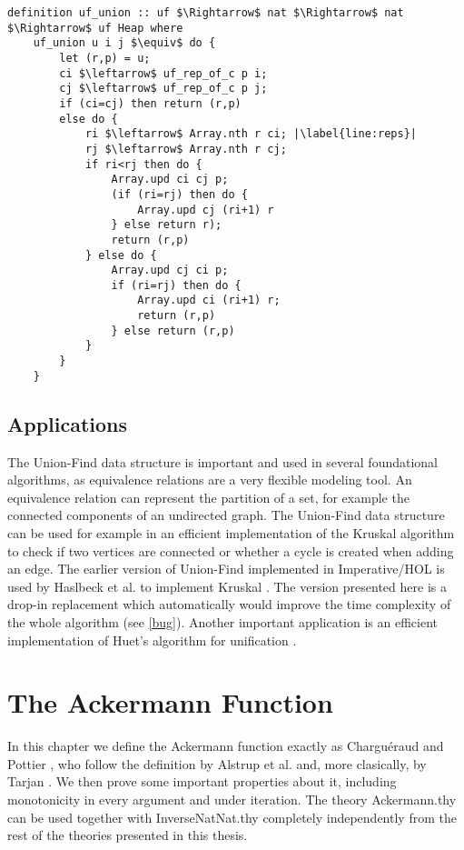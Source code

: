 \documentclass[headsepline,footsepline,footinclude=false,oneside,fontsize=11pt,paper=a4,listof=totoc,bibliography=totoc]{scrbook} %
\begin{document}
\begin{lstlisting}[mathescape=true, caption=The Union Operation,captionpos=b,escapechar=|]	
	definition uf_union :: uf $\Rightarrow$ nat $\Rightarrow$ nat $\Rightarrow$ uf Heap where 
	uf_union u i j $\equiv$ do {
		let (r,p) = u;
		ci $\leftarrow$ uf_rep_of_c p i;
		cj $\leftarrow$ uf_rep_of_c p j;
		if (ci=cj) then return (r,p) 
		else do {
			ri $\leftarrow$ Array.nth r ci; |\label{line:reps}|
			rj $\leftarrow$ Array.nth r cj;
			if ri<rj then do {
				Array.upd ci cj p;
				(if (ri=rj) then do {
					Array.upd cj (ri+1) r
				} else return r);
				return (r,p)
			} else do { 
				Array.upd cj ci p;
				if (ri=rj) then do {
					Array.upd ci (ri+1) r;
					return (r,p)
				} else return (r,p)
			}
		}
	}
\end{lstlisting}

\section{Applications}

The Union-Find data structure is important and used in several foundational algorithms, as equivalence relations are a very flexible modeling tool. An equivalence relation can represent the partition of a set, for example the connected components of an undirected graph. The Union-Find data structure can be used for example in an efficient implementation of the Kruskal algorithm to check if two vertices are connected or whether a cycle is created when adding an edge. 
The earlier version of Union-Find implemented in Imperative/HOL is used by Haslbeck et al. to implement Kruskal \cite{Kruskal-AFP}. The version presented here is a drop-in replacement which automatically would improve the time complexity of the whole algorithm (see \ref{bug}). Another important application is an efficient implementation of Huet's algorithm for unification \cite{Knight89}.



\chapter{The Ackermann Function}

In this chapter we define the Ackermann function exactly as Charguéraud and Pottier \cite{chargueraud17}, who follow the definition by Alstrup et al. \cite{Alstrup14} and, more clasically, by Tarjan \cite{Tarjan1975b}. We then prove some important properties about it, including monotonicity in every argument and under iteration.
The theory Ackermann.thy can be used together with InverseNatNat.thy completely independently from the rest of the theories presented in this thesis.
\end{document}
